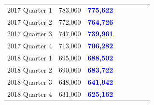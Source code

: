 \documentclass[12pt]{article}
\begin{document}
\begin{tabular}{|l|c|c|c|c|c|c|l}
\scriptsize
2017 Quarter 1 & \scriptsize{783,000} &  \scriptsize{\textcolor{blue}{\textbf{775,622}}}\\
\scriptsize
2017 Quarter 2 & \scriptsize{772,000} &  \scriptsize{\textcolor{blue}{\textbf{764,726}}}\\
\scriptsize
2017 Quarter 3 & \scriptsize{747,000} &  \scriptsize{\textcolor{blue}{\textbf{739,961}}}\\
\scriptsize
2017 Quarter 4 & \scriptsize{713,000} & \scriptsize{\textcolor{blue}{\textbf{706,282}}}\\
\scriptsize
2018 Quarter 1 & \scriptsize{695,000} &  \scriptsize{\textcolor{blue}{\textbf{688,502}}}\\
\scriptsize
2018 Quarter 2 & \scriptsize{690,000} &  \scriptsize{\textcolor{blue}{\textbf{683,722}}}\\
\scriptsize
2018 Quarter 3 & \scriptsize{648,000} &  \scriptsize{\textcolor{blue}{\textbf{641,942}}}\\
\scriptsize
2018 Quarter 4 & \scriptsize{631,000} &  \scriptsize{\textcolor{blue}{\textbf{625,162}}}\\
\hline
\end{tabular} 
\label{tab:template}
\\
\end{document}
